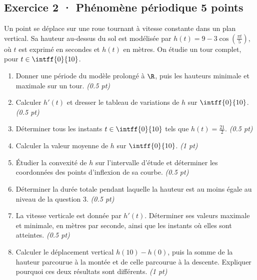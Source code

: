 \subsection*{Exercice 2 · Phénomène périodique \hfill 5 points}Un point se déplace sur une roue tournant à vitesse constante dans un plan vertical. Sa hauteur au-dessus du sol est modélisée par $h(t)=9-3\cos\left(\frac{\pi t}{5}\right)$, où $t$ est exprimé en secondes et $h(t)$ en mètres. On étudie un tour complet, pour $t\in\intff{0}{10}$.

\begin{enumerate}

\item Donner une période du modèle prolongé à $\R$, puis les hauteurs minimale et maximale sur un tour. \hfill\textit{(\num{0,5} pt)}

\item Calculer $h'(t)$ et dresser le tableau de variations de $h$ sur $\intff{0}{10}$. \hfill\textit{(\num{0,5} pt)}

\item Déterminer tous les instants $t\in\intff{0}{10}$ tels que $h(t)=\frac{21}{2}$. \hfill\textit{(\num{0,5} pt)}

\item Calculer la valeur moyenne de $h$ sur $\intff{0}{10}$. \hfill\textit{(1 pt)}

\item Étudier la convexité de $h$ sur l'intervalle d'étude et déterminer les coordonnées des points d'inflexion de sa courbe. \hfill\textit{(\num{0,5} pt)}

\item Déterminer la durée totale pendant laquelle la hauteur est au moins égale au niveau de la question 3. \hfill\textit{(\num{0,5} pt)}

\item La vitesse verticale est donnée par $h'(t)$. Déterminer ses valeurs maximale et minimale, en mètres par seconde, ainsi que les instants où elles sont atteintes. \hfill\textit{(\num{0,5} pt)}

\item Calculer le déplacement vertical $h(10)-h(0)$, puis la somme de la hauteur parcourue à la montée et de celle parcourue à la descente. Expliquer pourquoi ces deux résultats sont différents. \hfill\textit{(1 pt)}

\end{enumerate}

\mxnewpage{}


